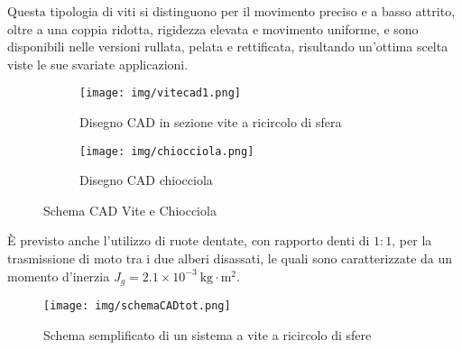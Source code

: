 \documentclass{article}
\begin{document}
Questa tipologia di viti si distinguono per il movimento preciso e a basso attrito, oltre a una coppia ridotta, rigidezza elevata e movimento uniforme, e sono disponibili nelle versioni rullata, pelata e rettificata, risultando un'ottima scelta viste le sue svariate applicazioni.

\begin{figure}[h!]
    \centering
    \begin{subfigure}{0.45\textwidth}
        \centering
        \texttt{[image: img/vitecad1.png]}
        \caption{ Disegno CAD in sezione vite a ricircolo di sfera}
        \label{fig:vite1}
    \end{subfigure}
    \hspace{0.05\textwidth}
    \begin{subfigure}{0.45\textwidth}
        \centering
        \texttt{[image: img/chiocciola.png]}
        \caption{Disegno CAD chiocciola}
        \label{fig:chiocciola1}
    \end{subfigure}
    \caption{Schema CAD Vite e Chiocciola}
    \label{fig:schemavitechiocciola1}
\end{figure}
È previsto anche l'utilizzo di ruote dentate, con rapporto denti di $1:1$, per la trasmissione di moto tra i due alberi disassati, le quali sono caratterizzate da un momento d’inerzia \( J_g = 2.1 \times 10^{-3} \ \mathrm{kg \cdot m^2} \).
\begin{figure}[h!]
    \centering
    \texttt{[image: img/schemaCADtot.png]}
    \caption{Schema semplificato di un sistema a vite a ricircolo di sfere}
    \label{fig: schemacad1}
\end{figure}
\end{document}
